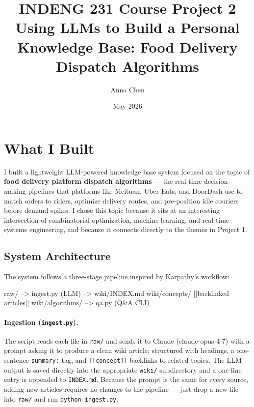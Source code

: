 \documentclass[11pt,a4paper]{article}
\title{\vspace{-1.2cm}\textbf{INDENG 231 Course Project 2}\\[0.2em]
\large Using LLMs to Build a Personal Knowledge Base: Food Delivery Dispatch Algorithms}
\author{Anna Chen}
\date{May 2026}
\begin{document}
\maketitle

\section{What I Built}

I built a lightweight LLM-powered knowledge base system focused on the topic
of \textbf{food delivery platform dispatch algorithms} --- the real-time
decision-making pipelines that platforms like Meituan, Uber Eats, and DoorDash
use to match orders to riders, optimize delivery routes, and pre-position idle
couriers before demand spikes.
I chose this topic because it sits at an interesting intersection of combinatorial
optimization, machine learning, and real-time systems engineering, and because
it connects directly to the themes in Project 1.

\subsection{System Architecture}

The system follows a three-stage pipeline inspired by Karpathy's workflow:

\begin{codeblock}
raw/  -->  ingest.py (LLM)  -->  wiki/INDEX.md
                                  wiki/concepts/   [[backlinked articles]]
                                  wiki/algorithms/
                              -->  qa.py (Q&A CLI)
\end{codeblock}

\paragraph{Ingestion (\texttt{ingest.py}).}
The script reads each file in \texttt{raw/} and sends it to Claude (claude-opus-4-7)
with a prompt asking it to produce a clean wiki article: structured with headings,
a one-sentence \texttt{summary:} tag, and \texttt{[[concept]]} backlinks to related topics.
The LLM output is saved directly into the appropriate \texttt{wiki/} subdirectory and
a one-line entry is appended to \texttt{INDEX.md}.
Because the prompt is the same for every source, adding new articles requires no
changes to the pipeline --- just drop a new file into \texttt{raw/} and run
\texttt{python ingest.py}.
\end{document}
